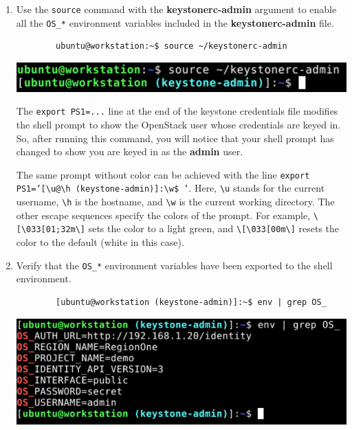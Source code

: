 \documentclass[letterpaper, 12pt]{article}
\begin{document}
\begin{enumerate}
    \item Use the \texttt{source} command with the \textbf{keystonerc-admin} argument to enable all the
    \texttt{OS\_*} environment variables included in the \textbf{keystonerc-admin} file.
    \begin{lstlisting}
        ubuntu@workstation:~$ source ~/keystonerc-admin
    \end{lstlisting}

    \begin{center}
        \includegraphics[width=\linewidth]{images/part2/step3.png}
    \end{center}
        
    \begin{notebox}
        The \texttt{export PS1=...} line at the end of the keystone credentials file modifies the shell prompt to show
        the OpenStack user whose credentials are keyed in. So, after running this command, you will notice that your
        shell prompt has changed to show you are keyed in as the \textbf{admin} user.
    \end{notebox}

    \begin{notebox}
        The same prompt without color can be achieved with the line
        \texttt{export PS1='[\textbackslash u@\textbackslash h (keystone-admin)]:\textbackslash w\$ '}. Here,
        \texttt{\textbackslash u} stands for the current username, \texttt{\textbackslash h} is the hostname, and
        \texttt{\textbackslash w} is the current working directory. The other escape sequences specify the colors of the
        prompt. For example, \texttt{\textbackslash[\textbackslash 033[01;32m\textbackslash]} sets the color to a light
        green, and \texttt{\textbackslash[\textbackslash 033[00m\textbackslash]} resets the color to the default
        (white in this case).
    \end{notebox}

    \item Verify that the \texttt{OS\_*} environment variables have been exported to the shell environment.
    \begin{lstlisting}
        [ubuntu@workstation (keystone-admin)]:~$ env | grep OS_
    \end{lstlisting}

    \begin{center}
        \includegraphics[width=\linewidth]{images/part2/step4.png}
    \end{center}


\end{enumerate}
\end{document}
